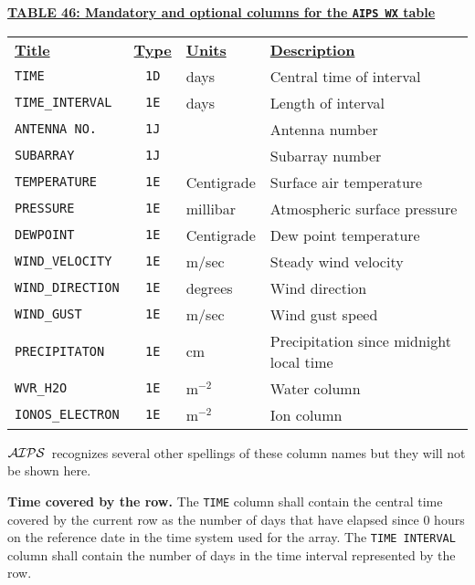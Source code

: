 \documentclass[twoside]{article}
\newcommand{\Hi}[1]{\textcolor{hicol}{#1}}
\newcommand{\AIPS}{{$\cal AIPS\/$}}
\begin{document}
\begin{center}
\underline{\bf{TABLE 46: Mandatory \Hi{and optional} columns for the
    {\tt AIPS WX} table}}\\
\begin{tabular}{lcll}
\noalign{\vspace{2pt}} \label{ta:WXcols}
\underline{{\bf Title\vphantom{y}}} & \underline{\bf{Type}} &
   \underline{{\bf Units\vphantom{y}}} & \underline{\bf{Description}} \\
\noalign{\vspace{2pt}}
{\tt TIME}           & {\tt 1D} & days & Central time of interval \\
{\tt TIME\_INTERVAL} & {\tt 1E} & days & Length of interval \\
{\tt ANTENNA NO.}   & {\tt 1J} &      & Antenna number \\
{\tt SUBARRAY}      & {\tt 1J} &      & Subarray number \\
{\tt TEMPERATURE}   & {\tt 1E} & Centigrade & Surface air temperature \\
{\tt PRESSURE}      & {\tt 1E} & millibar   & Atmospheric surface pressure \\
{\tt DEWPOINT}      & {\tt 1E} & Centigrade & Dew point temperature \\
{\tt WIND\_VELOCITY} & {\tt 1E} & m/sec     & Steady wind velocity \\
{\tt WIND\_DIRECTION} & {\tt 1E} & degrees  & Wind direction \\
\hline
\Hi{\tt WIND\_GUST}  & \Hi{\tt 1E} & \Hi{m/sec} &
                                       \Hi{Wind gust speed} \\
\Hi{\tt PRECIPITATON} & \Hi{\tt 1E} & \Hi{cm} &
                   \Hi{Precipitation since midnight local time} \\
{\tt WVR\_H2O}       & {\tt 1E} & m$^{-2}$  & Water column \\
{\tt IONOS\_ELECTRON} & {\tt 1E} & m$^{-2}$ & Ion column
\end{tabular}
\end{center}

\AIPS\ recognizes several other spellings of these column names but
they will not be shown here.

{\bf Time covered by the row.}  The {\tt TIME} column shall contain
the central time covered by the current row as the number of days
that have elapsed since 0 hours on the reference date in the time
system used for the array.  The {\tt TIME INTERVAL} column shall
contain the number of days in the time interval represented by the
row.
\end{document}
